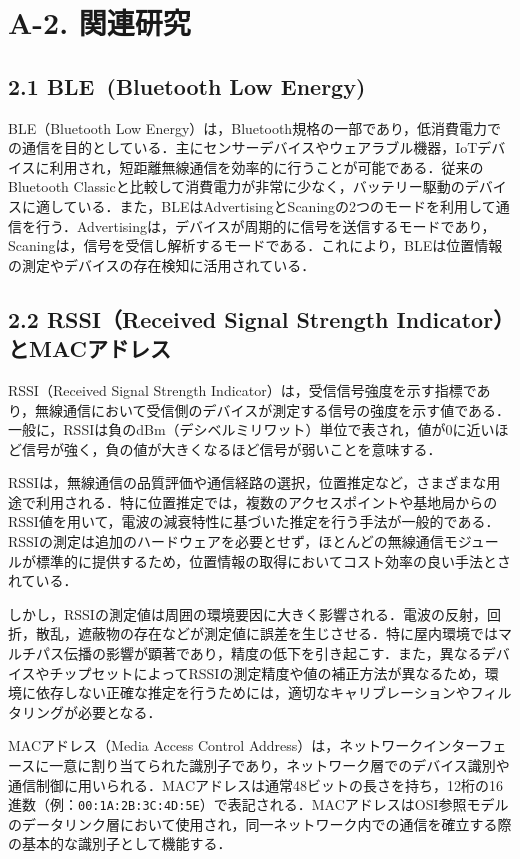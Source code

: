 \section*{A-2. 関連研究}

\subsection*{2.1 BLE\ (Bluetooth Low Energy)}
BLE（Bluetooth Low Energy）は，Bluetooth規格の一部であり，低消費電力での通信を目的としている．主にセンサーデバイスやウェアラブル機器，IoTデバイスに利用され，短距離無線通信を効率的に行うことが可能である．従来のBluetooth Classicと比較して消費電力が非常に少なく，バッテリー駆動のデバイスに適している．また，BLEはAdvertisingとScaningの2つのモードを利用して通信を行う．Advertisingは，デバイスが周期的に信号を送信するモードであり，Scaningは，信号を受信し解析するモードである．これにより，BLEは位置情報の測定やデバイスの存在検知に活用されている．

\subsection*{2.2 RSSI（Received Signal Strength Indicator）とMACアドレス}
RSSI（Received Signal Strength Indicator）は，受信信号強度を示す指標であり，無線通信において受信側のデバイスが測定する信号の強度を示す値である．一般に，RSSIは負のdBm（デシベルミリワット）単位で表され，値が0に近いほど信号が強く，負の値が大きくなるほど信号が弱いことを意味する．

RSSIは，無線通信の品質評価や通信経路の選択，位置推定など，さまざまな用途で利用される．特に位置推定では，複数のアクセスポイントや基地局からのRSSI値を用いて，電波の減衰特性に基づいた推定を行う手法が一般的である．RSSIの測定は追加のハードウェアを必要とせず，ほとんどの無線通信モジュールが標準的に提供するため，位置情報の取得においてコスト効率の良い手法とされている．

しかし，RSSIの測定値は周囲の環境要因に大きく影響される．電波の反射，回折，散乱，遮蔽物の存在などが測定値に誤差を生じさせる．特に屋内環境ではマルチパス伝播の影響が顕著であり，精度の低下を引き起こす．また，異なるデバイスやチップセットによってRSSIの測定精度や値の補正方法が異なるため，環境に依存しない正確な推定を行うためには，適切なキャリブレーションやフィルタリングが必要となる．


MACアドレス（Media Access Control Address）は，ネットワークインターフェースに一意に割り当てられた識別子であり，ネットワーク層でのデバイス識別や通信制御に用いられる．MACアドレスは通常48ビットの長さを持ち，12桁の16進数（例：\texttt{00:1A:2B:3C:4D:5E}）で表記される．MACアドレスはOSI参照モデルのデータリンク層において使用され，同一ネットワーク内での通信を確立する際の基本的な識別子として機能する．

